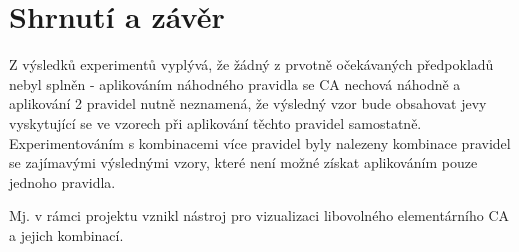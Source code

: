 \section{Shrnutí a závěr}
Z výsledků experimentů vyplývá, že žádný z prvotně očekávaných předpokladů nebyl splněn
- aplikováním náhodného pravidla se CA nechová náhodně a aplikování 2 pravidel
nutně neznamená, že výsledný vzor bude obsahovat jevy vyskytující se ve vzorech
při aplikování těchto pravidel samostatně.
Experimentováním s kombinacemi více pravidel byly nalezeny kombinace pravidel
se zajímavými výslednými vzory, které není možné získat aplikováním pouze jednoho
pravidla.

Mj. v rámci projektu vznikl nástroj pro vizualizaci libovolného elementárního CA
a jejich kombinací.
